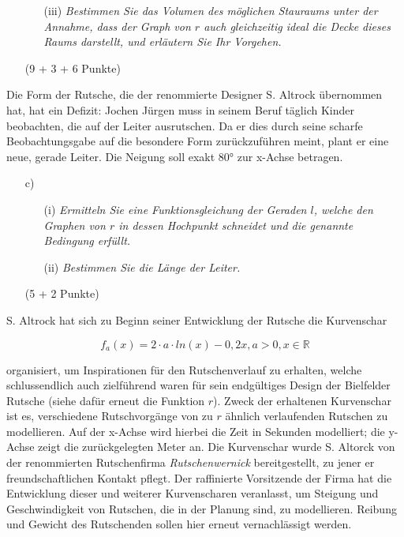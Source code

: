 \documentclass[ngerman, a4paper, 11pt]{article}
\begin{document}
\begin{enumerate}[resume]
    \item[]
        \begin{enumerate}[resume]
            \item[(iii)]
                \textit{Bestimmen Sie das Volumen des möglichen Stauraums unter der Annahme,
                dass der Graph von $r$ auch gleichzeitig ideal die Decke dieses Raums darstellt,
                und erläutern Sie Ihr Vorgehen.}
        \end{enumerate}
        \begin{flushright}
            (9 + 3 + 6 Punkte)
        \end{flushright}
\end{enumerate}

Die Form der Rutsche, die der renommierte Designer S. Altrock übernommen hat, hat ein Defizit:
Jochen Jürgen muss in seinem Beruf täglich Kinder beobachten, die auf der Leiter ausrutschen.
Da er dies durch seine scharfe Beobachtungsgabe auf die besondere Form zurückzuführen meint, plant er eine neue, gerade Leiter.
Die Neigung soll exakt 80° zur x-Achse betragen.

\begin{enumerate}[resume]
    \item[c)]
        \begin{enumerate}
            \item[(i)]
                \textit{Ermitteln Sie eine Funktionsgleichung der Geraden $l$,
                welche den Graphen von $r$ in dessen Hochpunkt schneidet und die genannte Bedingung erfüllt.}
            \item[(ii)]
                \textit{Bestimmen Sie die Länge der Leiter.}
        \end{enumerate}
        \begin{flushright}
            (5 + 2 Punkte)
        \end{flushright}
\end{enumerate}

S. Altrock hat sich zu Beginn seiner Entwicklung der Rutsche die Kurvenschar

$$f_{a}(x)=2\cdot a\cdot ln(x)-0,2x,a>0,x\in \mathbb{R}$$

organisiert, um Inspirationen für den Rutschenverlauf zu erhalten, welche schlussendlich auch zielführend waren für sein endgültiges Design der Bielfelder Rutsche (siehe dafür erneut die Funktion $r$). Zweck der erhaltenen Kurvenschar ist es, verschiedene Rutschvorgänge von zu $r$ ähnlich verlaufenden Rutschen zu modellieren. Auf der x-Achse wird hierbei die Zeit in Sekunden modelliert; die y-Achse zeigt die zurückgelegten Meter an. Die Kurvenschar wurde S. Altorck von der renommierten Rutschenfirma \textit{Rutschenwernick} bereitgestellt, zu jener er freundschaftlichen Kontakt pflegt. Der raffinierte Vorsitzende der Firma hat die Entwicklung dieser und weiterer Kurvenscharen veranlasst, um Steigung und Geschwindigkeit von Rutschen, die in der Planung sind, zu modellieren. Reibung und Gewicht des Rutschenden sollen hier erneut vernachlässigt werden.
\end{document}
